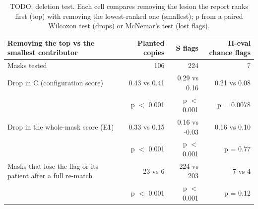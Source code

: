 \begin{table}
\centering
\small
\begin{tabular}{p{6.2cm}rrr}
\toprule
Removing the top vs the smallest contributor & Planted copies & S flags & H-eval chance flags \\
\midrule
Masks tested & 106 & 224 & 7 \\
Drop in C (configuration score) & 0.43 vs 0.41 & 0.29 vs 0.16 & 0.21 vs 0.08 \\
 & p $<$ 0.001 & p $<$ 0.001 & p = 0.0078 \\
Drop in the whole-mask score (E1) & 0.33 vs 0.15 & 0.16 vs -0.03 & 0.16 vs 0.10 \\
 & p $<$ 0.001 & p $<$ 0.001 & p = 0.77 \\
Masks that lose the flag or its patient after a full re-match & 23 vs 6 & 224 vs 203 & 7 vs 4 \\
 & p $<$ 0.001 & p $<$ 0.001 & p = 0.12 \\
\bottomrule
\end{tabular}
\caption{TODO: deletion test. Each cell compares removing the lesion the report ranks first (top) with removing the lowest-ranked one (smallest); p from a paired Wilcoxon test (drops) or McNemar's test (lost flags).}
\label{tab:deletion}
\end{table}
